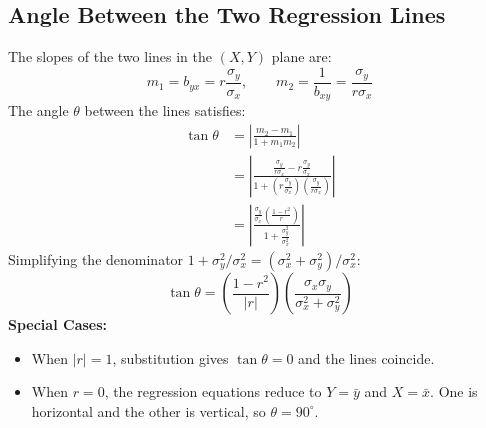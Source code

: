 \documentclass[12pt,a4paper]{article}
\begin{document}
\subsection{Angle Between the Two Regression Lines}
\begin{tcolorbox}[examplebox, title={\textbf{Derivation: Angle $\theta$ Between Regression Lines}}]
The slopes of the two lines in the $(X, Y)$ plane are:
\begin{equation}
  m_1 = b_{yx} = r \frac{\sigma_y}{\sigma_x}, \qquad m_2 = \frac{1}{b_{xy}} = \frac{\sigma_y}{r \sigma_x}
\end{equation}
The angle $\theta$ between the lines satisfies:
\begin{equation}
  \begin{aligned}
    \tan\theta &= \left|\frac{m_2 - m_1}{1 + m_1 m_2}\right| \\[3pt]
    &= \left|\frac{\frac{\sigma_y}{r\sigma_x} - r\frac{\sigma_y}{\sigma_x}}{1 + \left(r\frac{\sigma_y}{\sigma_x}\right)\left(\frac{\sigma_y}{r\sigma_x}\right)}\right| \\[3pt]
    &= \left|\frac{\frac{\sigma_y}{\sigma_x}\left(\frac{1 - r^2}{r}\right)}{1 + \frac{\sigma_y^2}{\sigma_x^2}}\right|
  \end{aligned}
\end{equation}
Simplifying the denominator $1 + \sigma_y^2/\sigma_x^2 = (\sigma_x^2 + \sigma_y^2)/\sigma_x^2$:
\begin{equation}
  \tan\theta = \left(\frac{1 - r^2}{|r|}\right) \left(\frac{\sigma_x \sigma_y}{\sigma_x^2 + \sigma_y^2}\right)
\end{equation}
\textbf{Special Cases:}
\begin{itemize}[leftmargin=*, itemsep=2pt]
  \item When $|r|=1$, substitution gives $\tan\theta=0$ and the lines coincide.
  \item When $r=0$, the regression equations reduce to $Y=\bar{y}$ and $X=\bar{x}$. One is horizontal and the other is vertical, so $\theta=90^\circ$.
\end{itemize}
\end{tcolorbox}
\end{document}
